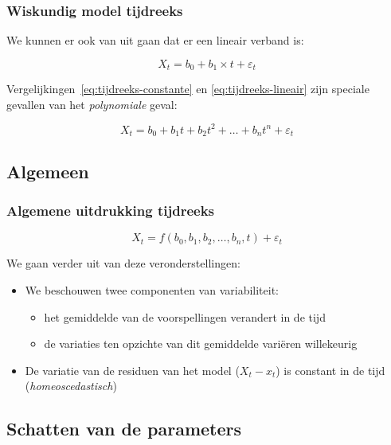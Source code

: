\documentclass{beamer}
\begin{document}
\begin{frame}
  \frametitle{Wiskundig model tijdreeks}

  We kunnen er ook van uit gaan dat er een lineair verband is:

  \begin{equation}
    X_{t} = b_{0} + b_{1} \times t + \varepsilon_{t}
    \label{eq:tijdreeks-lineair}
  \end{equation}

  Vergelijkingen~\ref{eq:tijdreeks-constante} en \ref{eq:tijdreeks-lineair} zijn speciale gevallen van het \emph{polynomiale} geval:

  \begin{equation}
    X_{t} = b_{0} + b_{1} t + b_{2} t^{2} + \dots + b_{n} t^{n} + \varepsilon_{t}
    \label{eq:tijdreeks-polynomiaal}
  \end{equation}
\end{frame}

\subsection{Algemeen}

\begin{frame}
  \frametitle{Algemene uitdrukking tijdreeks}

  \begin{equation}
    X_{t} = f(b_{0}, b_{1}, b_{2}, \dots , b_{n}, t) + \varepsilon_{t}
    \label{eq:tijdreeks-algemeen}
  \end{equation}

  We gaan verder uit van deze veronderstellingen:

  \begin{itemize}
    \item We beschouwen twee componenten van variabiliteit:
      \begin{itemize}
        \item het gemiddelde van de voorspellingen verandert in de tijd
        \item de variaties ten opzichte van dit gemiddelde variëren willekeurig
      \end{itemize}
    \item De variatie van de residuen van het model ($X_t - x_t$) is constant in de tijd (\emph{homeoscedastisch})
  \end{itemize}
\end{frame}

\subsection{Schatten van de parameters}
\end{document}
